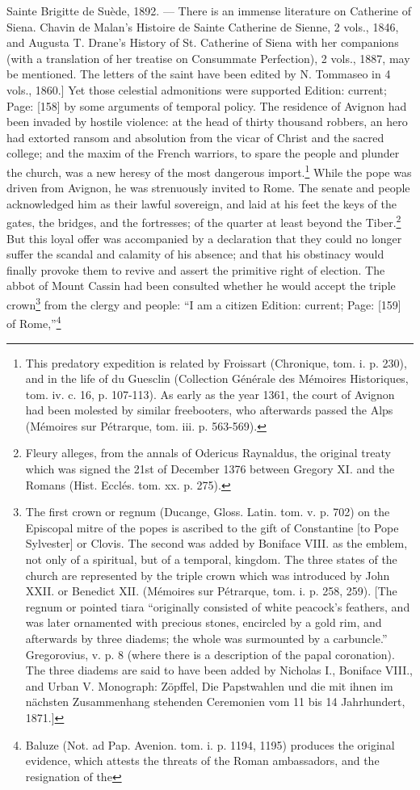 {Sainte Brigitte de Suède, 1892. \texthebrew{—} There is an immense literature on Catherine of Siena. Chavin de Malan\texthebrew{}’s Histoire de Sainte Catherine de Sienne, 2 vols., 1846, and Augusta T. Drane\texthebrew{}’s History of St. Catherine of Siena with her companions (with a translation of her treatise on Consummate Perfection), 2 vols., 1887, may be mentioned. The letters of the saint have been edited by N. Tommaseo in 4 vols., 1860.]} Yet those celestial admonitions were supported Edition: current; Page: [158] by some arguments of temporal policy. The residence of Avignon had been invaded by hostile violence: at the head of thirty thousand robbers, an hero had extorted ransom and absolution from the vicar of Christ and the sacred college; and the maxim of the French warriors, to spare the people and plunder the church, was a new heresy of the most dangerous import.\footnote{This predatory expedition is related by Froissart (Chronique, tom. i. p. 230), and in the life of du Guesclin (Collection Générale des Mémoires Historiques, tom. iv. c. 16, p. 107-113). As early as the year 1361, the court of Avignon had been molested by similar freebooters, who afterwards passed the Alps (Mémoires sur Pétrarque, tom. iii. p. 563-569).} While the pope was driven from Avignon, he was strenuously invited to Rome. The senate and people acknowledged him as their lawful sovereign, and laid at his feet the keys of the gates, the bridges, and the fortresses; of the quarter at least beyond the Tiber.\footnote{Fleury alleges, from the annals of Odericus Raynaldus, the original treaty which was signed the 21st of December 1376 between Gregory XI. and the Romans (Hist. Ecclés. tom. xx. p. 275).} But this loyal offer was accompanied by a declaration that they could no longer suffer the scandal and calamity of his absence; and that his obstinacy would finally provoke them to revive and assert the primitive right of election. The abbot of Mount Cassin had been consulted whether he would accept the triple crown\footnote{The first crown or regnum (Ducange, Gloss. Latin. tom. v. p. 702) on the Episcopal mitre of the popes is ascribed to the gift of Constantine [to Pope Sylvester] or Clovis. The second was added by Boniface VIII. as the emblem, not only of a spiritual, but of a temporal, kingdom. The three states of the church are represented by the triple crown which was introduced by John XXII. or Benedict XII. (Mémoires sur Pétrarque, tom. i. p. 258, 259). [The regnum or pointed tiara \texthebrew{“}originally consisted of white peacock\texthebrew{}’s feathers, and was later ornamented with precious stones, encircled by a gold rim, and afterwards by three diadems; the whole was surmounted by a carbuncle.\texthebrew{}” Gregorovius, v. p. 8 (where there is a description of the papal coronation). The three diadems are said to have been added by Nicholas I., Boniface VIII., and Urban V. Monograph: Zöpffel, Die Papstwahlen und die mit ihnen im nächsten Zusammenhang stehenden Ceremonien vom 11 bis 14 Jahrhundert, 1871.]} from the clergy and people: \texthebrew{“}I am a citizen Edition: current; Page: [159] of Rome,\texthebrew{}”\footnote{Baluze (Not. ad Pap. Avenion. tom. i. p. 1194, 1195) produces the original evidence, which attests the threats of the Roman ambassadors, and the resignation of the }
